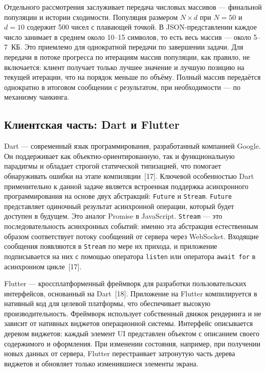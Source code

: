 \documentclass[14pt, russian]{scrartcl}
\begin{document}
Отдельного рассмотрения заслуживает передача числовых массивов ---
финальной популяции и истории сходимости. Популяция размером $N \times d$
при $N = 50$ и $d = 10$ содержит 500 чисел с плавающей точкой.
В JSON-представлении каждое число занимает в среднем около 10--15
символов, то есть весь массив --- около 5--7~КБ. Это приемлемо для
однократной передачи по завершении задачи. Для передачи в потоке
прогресса по итерациям массив популяции, как правило, не включается:
клиент получает только лучшее значение и лучшую позицию на текущей
итерации, что на порядок меньше по объёму. Полный массив передаётся
однократно в итоговом сообщении с результатом, при необходимости ---
по механизму чанкинга.

\subsection{Клиентская часть: Dart и Flutter}

Dart --- современный язык программирования, разработанный компанией
Google. Он поддерживает как объектно-ориентированную, так и
функциональную парадигмы и обладает строгой статической типизацией,
что помогает обнаруживать ошибки на этапе компиляции~[17]. Ключевой
особенностью Dart применительно к данной задаче является встроенная
поддержка асинхронного программирования на основе двух абстракций:
\texttt{Future} и \texttt{Stream}. \texttt{Future} представляет одиночный
результат асинхронной операции, который будет доступен в будущем. Это
аналог Promise в JavaScript. \texttt{Stream} --- это последовательность
асинхронных событий: именно эта абстракция естественным образом
соответствует потоку сообщений от сервера через WebSocket. Входящие
сообщения появляются в \texttt{Stream} по мере их прихода, и приложение
подписывается на них с помощью оператора \texttt{listen} или оператора
\texttt{await for} в асинхронном цикле~[17].

Flutter --- кроссплатформенный фреймворк для разработки пользовательских
интерфейсов, основанный на Dart~[18]. Приложение на Flutter компилируется
в нативный код для целевой платформы, что обеспечивает высокую
производительность. Фреймворк использует собственный движок рендеринга
и не зависит от нативных виджетов операционной системы. Интерфейс
описывается деревом виджетов: каждый элемент UI представлен объектом
с описанием своего содержимого и оформления. При изменении состояния, 
например, при получении новых данных от сервера, Flutter перестраивает
затронутую часть дерева виджетов и обновляет только изменившиеся
элементы экрана.
\end{document}
